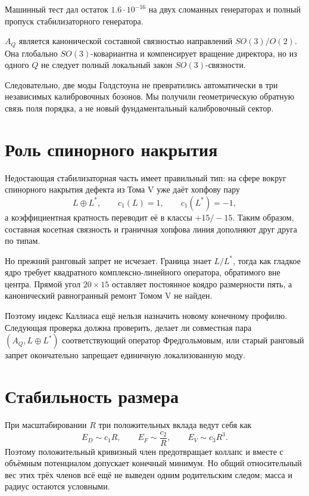 Машинный тест дал остаток $1.6\cdot10^{-16}$ на двух сломанных
генераторах и полный пропуск стабилизаторного генератора.

\begin{proposition}
$A_Q$ является канонической составной связностью направлений
$SO(3)/O(2)$. Она глобально $SO(3)$-ковариантна и компенсирует вращение
директора, но из одного $Q$ не следует полный локальный закон
$SO(3)$-связности.
\end{proposition}

Следовательно, две моды Голдстоуна не превратились автоматически в три
независимых калибровочных бозонов. Мы получили геометрическую обратную связь поля
порядка, а не новый фундаментальный калибровочный сектор.

\section{Роль спинорного накрытия}

Недостающая стабилизаторная часть имеет правильный тип: на сфере вокруг
спинорного накрытия дефекта из Тома V уже даёт хопфову пару
\begin{equation}
 L\oplus L^*,
 \qquad c_1(L)=1,
 \qquad c_1(L^*)=-1,
\end{equation}
а коэффициентная кратность переводит её в классы $+15/-15$.
Таким образом, составная косетная связность и граничная хопфова линия
дополняют друг друга по типам.

Но прежний ранговый запрет не исчезает. Граница знает $L/L^*$, тогда как
гладкое ядро требует квадратного комплексно-линейного оператора,
обратимого вне центра. Прямой угол $20\times15$ оставляет постоянное
коядро размерности пять, а канонический равногранный ремонт Томом V не
найден.

Поэтому индекс Каллиаса ещё нельзя назначить новому конечному профилю.
Следующая проверка должна проверить, делает ли совместная пара
$(A_Q,L\oplus L^*)$ соответствующий оператор Фредгольмовым, или старый
ранговый запрет окончательно запрещает единичную локализованную моду.

\section{Стабильность размера}

При масштабировании $R$ три положительных вклада ведут себя как
\begin{equation}
 E_D\sim c_1R,
 \qquad
 E_F\sim\frac{c_2}{R},
 \qquad
 E_V\sim c_3R^3.
\end{equation}
Поэтому положительный кривизный член предотвращает коллапс и вместе с
объёмным потенциалом допускает конечный минимум. Но общий относительный
вес этих трёх членов всё ещё не выведен одним родительским следом; масса и
радиус остаются условными.

